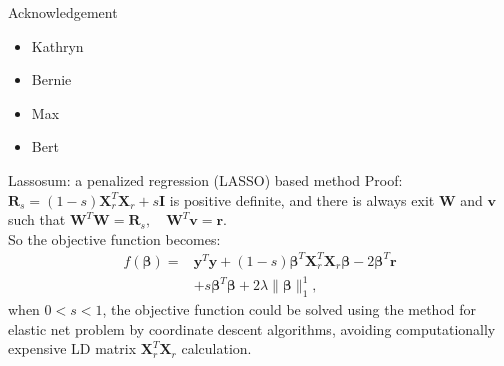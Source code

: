 \documentclass{beamer}
\begin{document}
\begin{frame}{Acknowledgement}
    \begin{itemize}
        \item Kathryn
        \item Bernie
        \item Max
        \item Bert
    \end{itemize}
\end{frame}

\begin{frame}
    
    
\end{frame}

    
\begin{frame}{Lassosum: a penalized regression (LASSO) based method \citep{mak2017polygenic}}
    Proof: \\
    $\boldsymbol{R}_{s}=(1-s) \boldsymbol{X}_{r}^{T} \boldsymbol{X}_{r}+s \boldsymbol{I}$ is positive definite, and there is always exit $\boldsymbol{W}$ and $\boldsymbol{v}$ such that $\boldsymbol{W}^{T} \boldsymbol{W}=\boldsymbol{R}_{s}, \quad \boldsymbol{W}^{T} \boldsymbol{v}=\boldsymbol{r}$.\\
    
    
    So the objective function becomes:
    $$
    \begin{aligned}
    f(\boldsymbol{\beta})=& \boldsymbol{y}^{T} \boldsymbol{y}+(1-s) \boldsymbol{\beta}^{T} \boldsymbol{X}_{r}^{T} \boldsymbol{X}_{r} \boldsymbol{\beta}-2 \boldsymbol{\beta}^{T} \boldsymbol{r} \\
    &+s \boldsymbol{\beta}^{T} \boldsymbol{\beta}+2 \lambda\|\boldsymbol{\beta}\|_{1}^{1},
    \end{aligned}
    $$   
    when $0 < s < 1$, the objective function could be solved using the method for elastic net problem by coordinate descent algorithms, avoiding computationally expensive LD matrix $\boldsymbol{X}_r^T\boldsymbol{X}_r$ calculation.
\end{frame}
\end{document}
